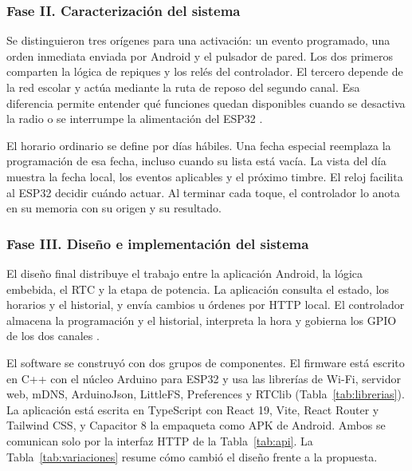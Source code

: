 \documentclass[a4paper,11pt]{article}
\begin{document}
\clearpage
\subsubsection{Fase II. Caracterización del sistema}
Se distinguieron tres orígenes para una activación: un evento programado, una orden inmediata enviada por Android y el pulsador de pared. Los dos primeros comparten la lógica de repiques y los relés del controlador. El tercero depende de la red escolar y actúa mediante la ruta de reposo del segundo canal. Esa diferencia permite entender qué funciones quedan disponibles cuando se desactiva la radio o se interrumpe la alimentación del ESP32 \cite{ficha,diagrama}.

El horario ordinario se define por días hábiles. Una fecha especial reemplaza la programación de esa fecha, incluso cuando su lista está vacía. La vista del día muestra la fecha local, los eventos aplicables y el próximo timbre. El reloj facilita al ESP32 decidir cuándo actuar. Al terminar cada toque, el controlador lo anota en su memoria con su origen y su resultado.

\subsubsection{Fase III. Diseño e implementación del sistema}
El diseño final distribuye el trabajo entre la aplicación Android, la lógica embebida, el RTC y la etapa de potencia. La aplicación consulta el estado, los horarios y el historial, y envía cambios u órdenes por HTTP local. El controlador almacena la programación y el historial, interpreta la hora y gobierna los GPIO de los dos canales \cite{ficha,diagrama,repo}.

El software se construyó con dos grupos de componentes. El firmware está escrito en C++ con el núcleo Arduino para ESP32 y usa las librerías de Wi-Fi, servidor web, mDNS, ArduinoJson, LittleFS, Preferences y RTClib (Tabla~\ref{tab:librerias}). La aplicación está escrita en TypeScript con React 19, Vite, React Router y Tailwind CSS, y Capacitor 8 la empaqueta como APK de Android. Ambos se comunican solo por la interfaz HTTP de la Tabla~\ref{tab:api}. La Tabla~\ref{tab:variaciones} resume cómo cambió el diseño frente a la propuesta.
\end{document}
